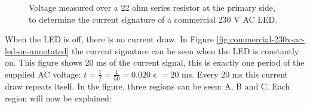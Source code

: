 \begin{figure}[t]
	\centering     %

	\caption{Voltage measured over a 22 ohm series resistor at the primary side, to determine the current signature of a commercial 230 V AC LED.}
\end{figure}



When the LED is off, there is no current draw.
In Figure \ref{fig:commercial-230v-ac-led-on-annotated} the current signature can be seen when the LED is constantly on.
This figure shows 20 ms of the current signal, this is exactly one period of the supplied AC voltage: $t = \frac{1}{f} = \frac{1}{50} = 0.020$ s $= 20$ ms.
Every 20 ms this current draw repeats itself.
In the figure, three regions can be seen: A, B and C.
Each region will now be explained:

